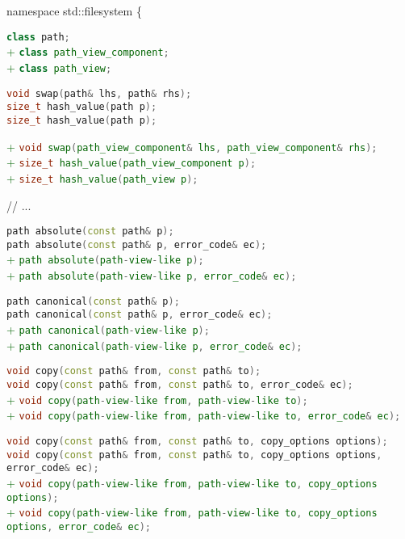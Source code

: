 \documentclass[11pt]{article}
\newcommand{\code}[2][cpp]{\lstinline[language=#1,basicstyle=\small\ttfamily]{#2}}
\newcommand{\tsreplace}[3]{\textcolor{red}{\sout{#1}}#2\textcolor{darkgreen}{#3}}
\begin{document}
\tsreplace{}{namespace std::filesystem \{ }{}

\tsreplace{}{  \code{class path;}}{}\\
\tsreplace{}{}{+ \code{class path_view_component;}}\\
\tsreplace{}{}{+ \code{class path_view;}}

\tsreplace{}{  \code{void swap(path& lhs, path& rhs);}}{}\\
\tsreplace{}{  \code{size_t hash_value(path p);}}{}\\
\tsreplace{}{  \code{size_t hash_value(path p);}}{}

\tsreplace{}{}{+ \code{void swap(path_view_component& lhs, path_view_component& rhs);}}\\
\tsreplace{}{}{+ \code{size_t hash_value(path_view_component p);}}\\
\tsreplace{}{}{+ \code{size_t hash_value(path_view p);}}

\tsreplace{}{// ...}{}

\tsreplace{}{  \code{path absolute(const path& p);}}{}\\
\tsreplace{}{  \code{path absolute(const path& p, error_code& ec);}}{}\\
\tsreplace{}{}{+ \code{path absolute(path-view-like p);}}\\
\tsreplace{}{}{+ \code{path absolute(path-view-like p, error_code& ec);}}

\tsreplace{}{  \code{path canonical(const path& p);}}{}\\
\tsreplace{}{  \code{path canonical(const path& p, error_code& ec);}}{}\\
\tsreplace{}{}{+ \code{path canonical(path-view-like p);}}\\
\tsreplace{}{}{+ \code{path canonical(path-view-like p, error_code& ec);}}

\tsreplace{}{  \code{void copy(const path& from, const path& to);}}{}\\
\tsreplace{}{  \code{void copy(const path& from, const path& to, error_code& ec);}}{}\\
\tsreplace{}{}{+ \code{void copy(path-view-like from, path-view-like to);}}\\
\tsreplace{}{}{+ \code{void copy(path-view-like from, path-view-like to, error_code& ec);}}

\tsreplace{}{  \code{void copy(const path& from, const path& to, copy_options options);}}{}\\
\tsreplace{}{  \code{void copy(const path& from, const path& to, copy_options options, error_code& ec);}}{}\\
\tsreplace{}{}{+ \code{void copy(path-view-like from, path-view-like to, copy_options options);}}\\
\tsreplace{}{}{+ \code{void copy(path-view-like from, path-view-like to, copy_options options, error_code& ec);}}
\end{document}
